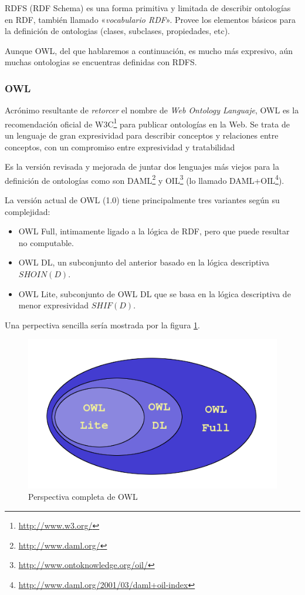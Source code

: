 RDFS\cite{RDFS} (RDF Schema) es una forma primitiva y limitada de describir 
ontologías en RDF, también llamado «\emph{vocabulario RDF}». Provee los elementos
básicos para la definición de ontologias (clases, subclases, propiedades, etc).

Aunque OWL, del que hablaremos a continuación, es mucho más expresivo, aún muchas
ontologias se encuentras definidas con RDFS.

\subsubsection{OWL}

Acrónimo resultante de \emph{retorcer} el nombre de 
\emph{Web Ontology Languaje}, OWL\cite{OWL} es la recomendación 
oficial de W3C\footnote{\url{http://www.w3.org/}} para publicar ontologías en 
la Web. Se trata de un lenguaje de gran expresividad para describir conceptos 
y relaciones entre conceptos, con un compromiso entre expresividad y tratabilidad

Es la versión revisada y mejorada de juntar dos lenguajes más viejos para la 
definición de ontologías como son DAML\footnote{\url{http://www.daml.org/}} y 
OIL\footnote{\url{http://www.ontoknowledge.org/oil/}} (lo llamado
DAML+OIL\footnote{\url{http://www.daml.org/2001/03/daml+oil-index}}).

La versión actual de OWL (1.0) tiene principalmente tres variantes según su
complejidad:

\begin{itemize}
  \item OWL Full, intimamente ligado a la lógica de RDF, pero que puede resultar
	no computable.
  \item OWL DL, un subconjunto del anterior basado en la lógica descriptiva 
	${SHOIN} (D)$.
  \item OWL Lite, subconjunto de OWL DL que se basa en la lógica descriptiva 
	de menor expresividad ${SHIF} (D)$.
\end{itemize}

Una perpectiva sencilla sería mostrada por la figura \ref{fig:owlVariants}.

\begin{figure}[tp]
	\centering
	\includegraphics[width=12cm]{images/owl-variants.png}
	\caption{Perspectiva completa de OWL}
	\label{fig:owlVariants}
\end{figure}

